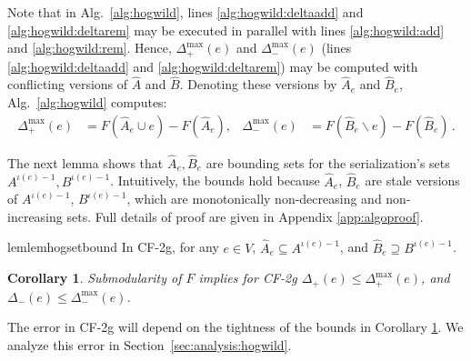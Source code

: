 \documentclass{article} %
\newcommand{\hogwild}{CF-2g}
\newtheorem{cor}[thm]{Corollary}
\newcommand{\secref}[1]{Section~\ref{#1}}
\newcommand{\algref}[1]{Alg.~\ref{#1}}
\begin{document}
Note that in \algref{alg:hogwild}, lines \ref{alg:hogwild:deltaadd} and \ref{alg:hogwild:deltarem} may be executed in parallel with lines \ref{alg:hogwild:add} and \ref{alg:hogwild:rem}.
Hence, $\Delta_+^{\max}(e)$ and $\Delta_-^{\max}(e)$ (lines \ref{alg:hogwild:deltaadd} and \ref{alg:hogwild:deltarem}) may be computed with conflicting versions of $\hat{A}$ and $\hat{B}$.
Denoting these versions by $\hat{A}_e$ and $\hat{B}_e$, \algref{alg:hogwild} computes:
\begin{align*}
  \Delta_{+}^{\max}(e) &= F(\hat{A}_e\cup e) - F(\hat{A}_e),
& \Delta_{-}^{\max}(e) &= F(\hat{B}_e\backslash e) - F(\hat{B}_e) \, .
\end{align*}

The next lemma shows that $\hat{A}_e, \hat{B}_e$ are bounding sets for the serialization's sets $A^{\iota(e)-1}, B^{\iota(e)-1}$.
Intuitively, the bounds hold because $\hat{A}_e$, $\hat{B}_e$ are stale versions of $A^{\iota(e)-1}$, $B^{\iota(e)-1}$, which are monotonically non-decreasing and non-increasing sets.
Full details of proof are given in Appendix \ref{app:algoproof}.

\begin{restatable}{lem}{lemhogsetbound}\label{lem:hog:set_bound}
In \hogwild{}, for any $e\in V$, $\hat{A}_e \subseteq A^{\iota(e)-1}$, and $\hat{B}_e \supseteq B^{\iota(e)-1}$.
\end{restatable}

\begin{cor}\label{cor:hog:delta_bound}
Submodularity of $F$ implies for \hogwild{}
$\Delta_{+}(e) \leq \Delta_{+}^{\max}(e)$, and
$\Delta_{-}(e) \leq \Delta_{-}^{\max}(e)$.
\end{cor}

The error in \hogwild{} will depend on the tightness of the bounds in Corollary \ref{cor:hog:delta_bound}.
We analyze this error in \secref{sec:analysis:hogwild}.

\end{document}
